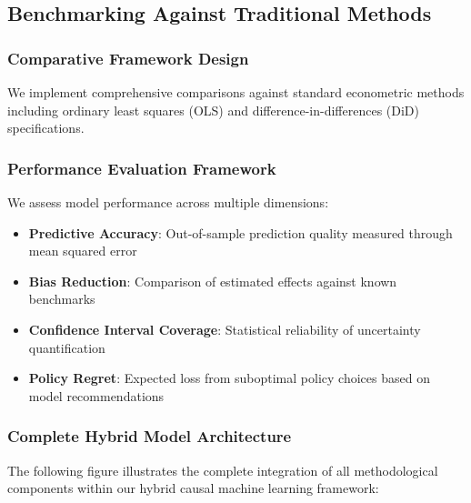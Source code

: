 \subsection{Benchmarking Against Traditional Methods}\label{subsec:benchmark}

\subsubsection{Comparative Framework Design}
We implement comprehensive comparisons against standard econometric methods including ordinary least squares (OLS) and difference-in-differences (DiD) specifications.

\subsubsection{Performance Evaluation Framework}
We assess model performance across multiple dimensions:
\begin{itemize}
    \item \textbf{Predictive Accuracy}: Out-of-sample prediction quality measured through mean squared error
    \item \textbf{Bias Reduction}: Comparison of estimated effects against known benchmarks
    \item \textbf{Confidence Interval Coverage}: Statistical reliability of uncertainty quantification
    \item \textbf{Policy Regret}: Expected loss from suboptimal policy choices based on model recommendations
\end{itemize}


\subsubsection{Complete Hybrid Model Architecture}
The following figure illustrates the complete integration of all methodological components within our hybrid causal machine learning framework:

